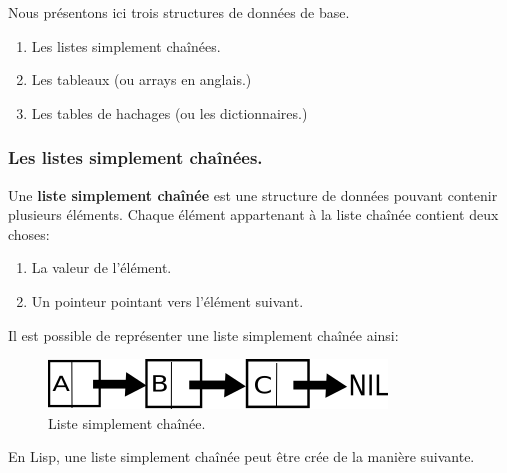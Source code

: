 \documentclass[a4paper, 12pt]{article}
\numberwithin{equation}{subsection}
\begin{document}
Nous présentons ici trois structures de données de base.
\begin{enumerate}
  \item Les listes simplement chaînées.
  \item Les tableaux (ou arrays en anglais.)
  \item Les tables de hachages (ou les dictionnaires.) \\[0.2cm]
\end{enumerate}

\subsubsection{Les listes simplement chaînées.}
Une {\bf liste simplement chaînée} est une structure de données pouvant contenir plusieurs éléments. Chaque élément appartenant à la liste chaînée contient deux choses:
\begin{enumerate}
  \item La valeur de l'élément.
  \item Un pointeur pointant vers l'élément suivant. \\[0.2cm]
\end{enumerate}

Il est possible de représenter une liste simplement chaînée ainsi: \\
\begin{figure}[H]
  \centering
  \includegraphics[width=9.0cm]{imgs/linked_list.png}
  \caption{Liste simplement chaînée.}
\end{figure}
En Lisp, une liste simplement chaînée peut être crée de la manière suivante. \\
\end{document}
